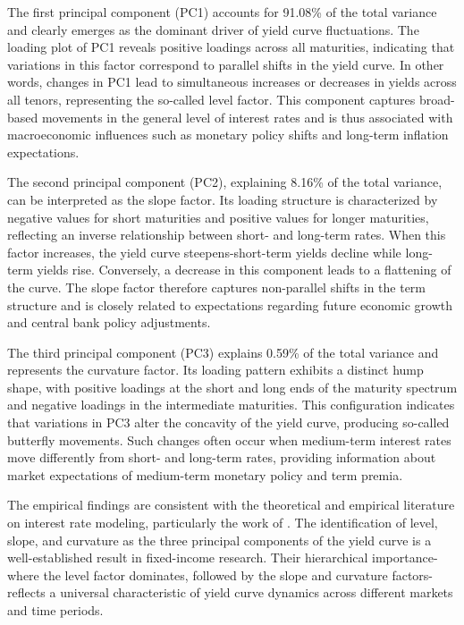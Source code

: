 The first principal component (PC1) accounts for 91.08\% of the total variance and clearly emerges as the dominant driver of yield curve fluctuations. The loading plot of PC1 reveals positive loadings across all maturities, indicating that variations in this factor correspond to parallel shifts in the yield curve. In other words, changes in PC1 lead to simultaneous increases or decreases in yields across all tenors, representing the so-called level factor. This component captures broad-based movements in the general level of interest rates and is thus associated with macroeconomic influences such as monetary policy shifts and long-term inflation expectations.

The second principal component (PC2), explaining 8.16\% of the total variance, can be interpreted as the slope factor. Its loading structure is characterized by negative values for short maturities and positive values for longer maturities, reflecting an inverse relationship between short- and long-term rates. When this factor increases, the yield curve steepens-short-term yields decline while long-term yields rise. Conversely, a decrease in this component leads to a flattening of the curve. The slope factor therefore captures non-parallel shifts in the term structure and is closely related to expectations regarding future economic growth and central bank policy adjustments.

The third principal component (PC3) explains 0.59\% of the total variance and represents the curvature factor. Its loading pattern exhibits a distinct hump shape, with positive loadings at the short and long ends of the maturity spectrum and negative loadings in the intermediate maturities. This configuration indicates that variations in PC3 alter the concavity of the yield curve, producing so-called butterfly movements. Such changes often occur when medium-term interest rates move differently from short- and long-term rates, providing information about market expectations of medium-term monetary policy and term premia.

The empirical findings are consistent with the theoretical and empirical literature on interest rate modeling, particularly the work of \parencite[pp.~98--107]{Rebonato_2018}. The identification of level, slope, and curvature as the three principal components of the yield curve is a well-established result in fixed-income research. Their hierarchical importance-where the level factor dominates, followed by the slope and curvature factors-reflects a universal characteristic of yield curve dynamics across different markets and time periods.


